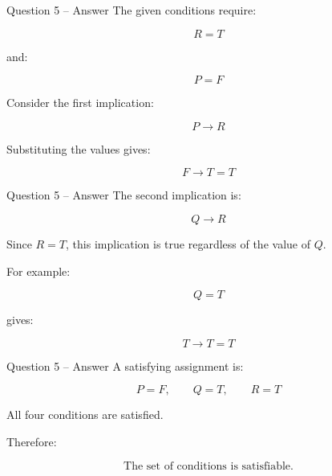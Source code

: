\begin{frame}{Question 5 -- Answer}
The given conditions require:

$$
R=T
$$

and:

$$
P=F
$$

Consider the first implication:

$$
P\rightarrow R
$$

Substituting the values gives:

$$
F\rightarrow T=T
$$

\end{frame}

\begin{frame}{Question 5 -- Answer}
The second implication is:

$$
Q\rightarrow R
$$

Since $R=T$, this implication is true regardless of the value of $Q$.

For example:

$$
Q=T
$$

gives:

$$
T\rightarrow T=T
$$

\end{frame}

\begin{frame}{Question 5 -- Answer}
A satisfying assignment is:

$$
P=F,\qquad Q=T,\qquad R=T
$$

All four conditions are satisfied.

Therefore:

$$
\boxed{\text{The set of conditions is satisfiable.}}
$$

\end{frame}
